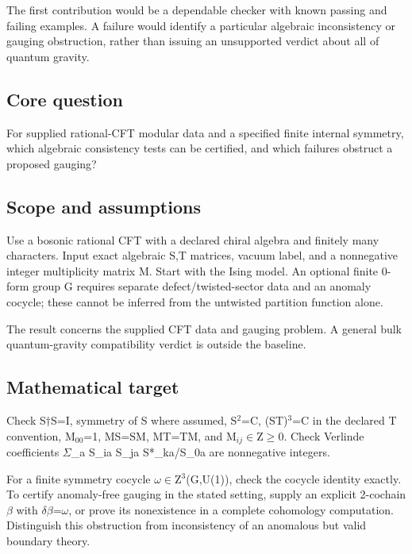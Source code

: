 \documentclass[
  11pt,
]{article}
\newcounter{none} %
\begin{document}
The first contribution would be a dependable checker with known passing
and failing examples. A failure would identify a particular algebraic
inconsistency or gauging obstruction, rather than issuing an unsupported
verdict about all of quantum gravity.

\subsection{Core question}

For supplied rational-CFT modular data and a specified finite internal
symmetry, which algebraic consistency tests can be certified, and which
failures obstruct a proposed gauging?

\subsection{Scope and assumptions}

Use a bosonic rational CFT with a declared chiral algebra and finitely
many characters. Input exact algebraic S,T matrices, vacuum label, and a
nonnegative integer multiplicity matrix M. Start with the Ising model.
An optional finite 0-form group G requires separate
defect/twisted-sector data and an anomaly cocycle; these cannot be
inferred from the untwisted partition function alone.

The result concerns the supplied CFT data and gauging problem. A general
bulk quantum-gravity compatibility verdict is outside the baseline.

\subsection{Mathematical target}

Check S\ensuremath{\dagger}S=I, symmetry of S where assumed,
S\ensuremath{{}^{2}}=C, (ST)\ensuremath{{}^{3}}=C in the declared T
convention, M\ensuremath{{}_{00}}=1, MS=SM, MT=TM, and
M\ensuremath{{}_{ij}}\ensuremath{\in}Z\ensuremath{\ge}0. Check Verlinde
coefficients \ensuremath{\Sigma}\_a S\_ia S\_ja S*\_ka/S\_0a are
nonnegative integers.

For a finite symmetry cocycle
\ensuremath{\omega}\ensuremath{\in}Z\ensuremath{{}^{3}}(G,U(1)), check
the cocycle identity exactly. To certify anomaly-free gauging in the
stated setting, supply an explicit 2-cochain \ensuremath{\beta} with
\ensuremath{\delta}\ensuremath{\beta}=\ensuremath{\omega}, or prove its
nonexistence in a complete cohomology computation. Distinguish this
obstruction from inconsistency of an anomalous but valid boundary
theory.
\end{document}
